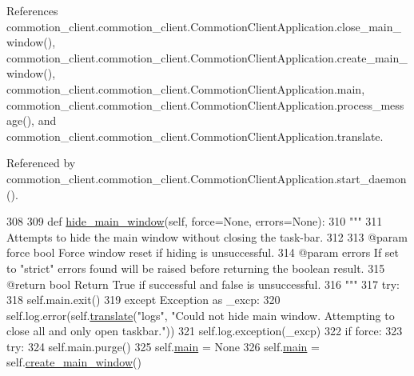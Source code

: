 References commotion\-\_\-client.\-commotion\-\_\-client.\-Commotion\-Client\-Application.\-close\-\_\-main\-\_\-window(), commotion\-\_\-client.\-commotion\-\_\-client.\-Commotion\-Client\-Application.\-create\-\_\-main\-\_\-window(), commotion\-\_\-client.\-commotion\-\_\-client.\-Commotion\-Client\-Application.\-main, commotion\-\_\-client.\-commotion\-\_\-client.\-Commotion\-Client\-Application.\-process\-\_\-message(), and commotion\-\_\-client.\-commotion\-\_\-client.\-Commotion\-Client\-Application.\-translate.



Referenced by commotion\-\_\-client.\-commotion\-\_\-client.\-Commotion\-Client\-Application.\-start\-\_\-daemon().


\begin{DoxyCode}
308 
309     \textcolor{keyword}{def }\hyperlink{classcommotion__client_1_1commotion__client_1_1CommotionClientApplication_a6b8f22fc6aaab6e6105f7832a7bf11b9}{hide\_main\_window}(self, force=None, errors=None):
310         \textcolor{stringliteral}{"""}
311 \textcolor{stringliteral}{        Attempts to hide the main window without closing the task-bar.}
312 \textcolor{stringliteral}{}
313 \textcolor{stringliteral}{        @param force bool Force window reset if hiding is unsuccessful.}
314 \textcolor{stringliteral}{        @param errors If set to "strict" errors found will be raised before returning the boolean result.}
315 \textcolor{stringliteral}{        @return bool Return True if successful and false is unsuccessful.}
316 \textcolor{stringliteral}{        """}
317         \textcolor{keywordflow}{try}:
318             self.main.exit()
319         \textcolor{keywordflow}{except} Exception \textcolor{keyword}{as} \_excp:
320             self.log.error(self.\hyperlink{classcommotion__client_1_1commotion__client_1_1CommotionClientApplication_a57e951c9b241fb0e0c70055b4ca1b6f7}{translate}(\textcolor{stringliteral}{"logs"}, \textcolor{stringliteral}{"Could not hide main window. Attempting to close
       all and only open taskbar."}))
321             self.log.exception(\_excp)
322             \textcolor{keywordflow}{if} force:
323                 \textcolor{keywordflow}{try}:
324                     self.main.purge()
325                     self.\hyperlink{classcommotion__client_1_1commotion__client_1_1CommotionClientApplication_a4ae692cf60dc0a935cf2e8a72f657d1a}{main} = \textcolor{keywordtype}{None}
326                     self.\hyperlink{classcommotion__client_1_1commotion__client_1_1CommotionClientApplication_a4ae692cf60dc0a935cf2e8a72f657d1a}{main} = self.\hyperlink{classcommotion__client_1_1commotion__client_1_1CommotionClientApplication_a726949d610a2bd566d1f3745b74c7b42}{create\_main\_window}()

\end{DoxyCode}
